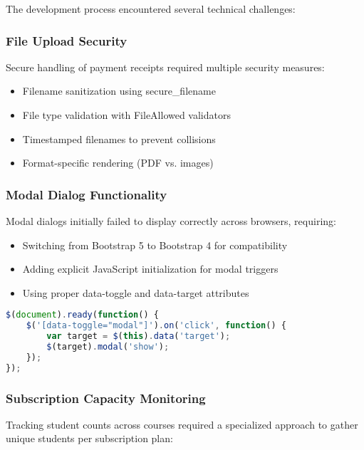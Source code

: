 The development process encountered several technical challenges:

\subsubsection{File Upload Security}

Secure handling of payment receipts required multiple security measures:
\begin{itemize}
    \item Filename sanitization using secure\_filename
    \item File type validation with FileAllowed validators
    \item Timestamped filenames to prevent collisions
    \item Format-specific rendering (PDF vs. images)
\end{itemize}

\subsubsection{Modal Dialog Functionality}

Modal dialogs initially failed to display correctly across browsers, requiring:
\begin{itemize}
    \item Switching from Bootstrap 5 to Bootstrap 4 for compatibility
    \item Adding explicit JavaScript initialization for modal triggers
    \item Using proper data-toggle and data-target attributes
\end{itemize}

\begin{lstlisting}[language=JavaScript, caption=Modal Initialization, label=lst:modal-js]
$(document).ready(function() {
    $('[data-toggle="modal"]').on('click', function() {
        var target = $(this).data('target');
        $(target).modal('show');
    });
});
\end{lstlisting}

\subsubsection{Subscription Capacity Monitoring}

Tracking student counts across courses required a specialized approach to gather unique students per subscription plan:

